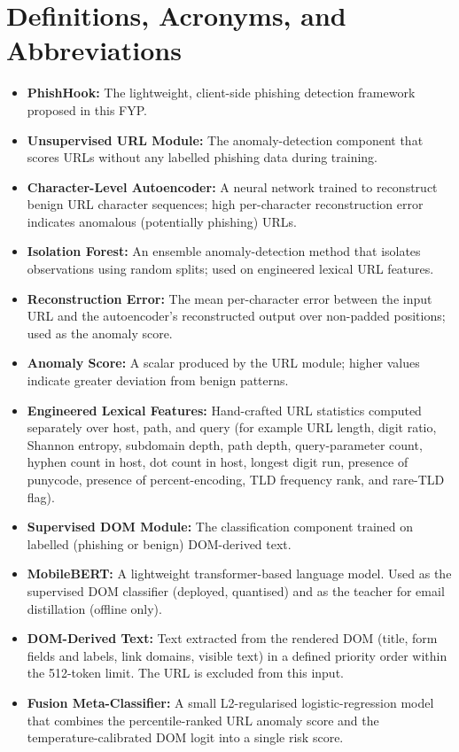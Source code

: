 \documentclass{FastFyp}
\begin{document}
\section{Definitions, Acronyms, and Abbreviations}
\begin{itemize}
    \item \textbf{PhishHook:} The lightweight, client-side phishing detection framework proposed in this FYP.
    \item \textbf{Unsupervised URL Module:} The anomaly-detection component that scores URLs without any labelled phishing data during training.
    \item \textbf{Character-Level Autoencoder:} A neural network trained to reconstruct benign URL character sequences; high per-character reconstruction error indicates anomalous (potentially phishing) URLs.
    \item \textbf{Isolation Forest:} An ensemble anomaly-detection method that isolates observations using random splits; used on engineered lexical URL features.
    \item \textbf{Reconstruction Error:} The mean per-character error between the input URL and the autoencoder's reconstructed output over non-padded positions; used as the anomaly score.
    \item \textbf{Anomaly Score:} A scalar produced by the URL module; higher values indicate greater deviation from benign patterns.
    \item \textbf{Engineered Lexical Features:} Hand-crafted URL statistics computed separately over host, path, and query (for example URL length, digit ratio, Shannon entropy, subdomain depth, path depth, query-parameter count, hyphen count in host, dot count in host, longest digit run, presence of punycode, presence of percent-encoding, TLD frequency rank, and rare-TLD flag).
    \item \textbf{Supervised DOM Module:} The classification component trained on labelled (phishing or benign) DOM-derived text.
    \item \textbf{MobileBERT:} A lightweight transformer-based language model. Used as the supervised DOM classifier (deployed, quantised) and as the teacher for email distillation (offline only).
    \item \textbf{DOM-Derived Text:} Text extracted from the rendered DOM (title, form fields and labels, link domains, visible text) in a defined priority order within the 512-token limit. The URL is excluded from this input.
    \item \textbf{Fusion Meta-Classifier:} A small L2-regularised logistic-regression model that combines the percentile-ranked URL anomaly score and the temperature-calibrated DOM logit into a single risk score.

\end{itemize}
\end{document}
